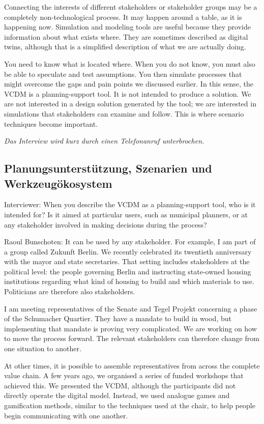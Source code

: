 Connecting the interests of different stakeholders or stakeholder groups may be a completely non-technological process. It may happen around a table, as it is happening now. Simulation and modeling tools are useful because they provide information about what exists where. They are sometimes described as digital twins, although that is a simplified description of what we are actually doing.

You need to know what is located where. When you do not know, you must also be able to speculate and test assumptions. You then simulate processes that might overcome the gaps and pain points we discussed earlier. In this sense, the VCDM is a planning-support tool. It is not intended to produce a solution. We are not interested in a design solution generated by the tool; we are interested in simulations that stakeholders can examine and follow. This is where scenario techniques become important.

\textit{Das Interview wird kurz durch einen Telefonanruf unterbrochen.}

\subsection{Planungsunterstützung, Szenarien und Werkzeugökosystem}

Interviewer: When you describe the VCDM as a planning-support tool, who is it intended for? Is it aimed at particular users, such as municipal planners, or at any stakeholder involved in making decisions during the process?

Raoul Bunschoten: It can be used by any stakeholder. For example, I am part of a group called Zukunft Berlin. We recently celebrated its twentieth anniversary with the mayor and state secretaries. That setting includes stakeholders at the political level: the people governing Berlin and instructing state-owned housing institutions regarding what kind of housing to build and which materials to use. Politicians are therefore also stakeholders.

I am meeting representatives of the Senate and Tegel Projekt concerning a phase of the Schumacher Quartier. They have a mandate to build in wood, but implementing that mandate is proving very complicated. We are working on how to move the process forward. The relevant stakeholders can therefore change from one situation to another.

At other times, it is possible to assemble representatives from across the complete value chain. A few years ago, we organised a series of funded workshops that achieved this. We presented the VCDM, although the participants did not directly operate the digital model. Instead, we used analogue games and gamification methods, similar to the techniques used at the chair, to help people begin communicating with one another.

